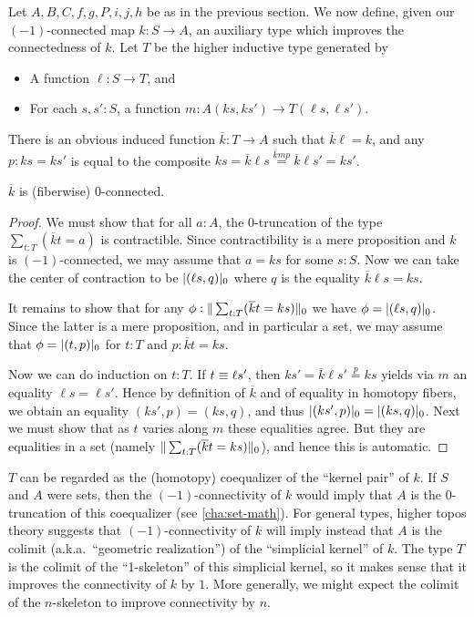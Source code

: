 Let $A,B,C,f,g,P,i,j,h$ be as in the previous section.
We now define, given our $(-1)$-connected map $k:S\to A$, an auxiliary type which improves the connectedness of $k$.
Let $T$ be the higher inductive type generated by
\begin{itemize}
\item A function $\ell:S\to T$, and
\item For each $s,s':S$, a function $m:A(ks,ks') \to T(\ell s, \ell s')$.
\end{itemize}
\newcommand{\kbar}{\overline{k}}
There is an obvious induced function $\kbar:T\to A$ such that $\kbar \ell = k$, and any $p:ks=ks'$ is equal to the composite $ks = \kbar \ell s \overset{\kbar m p}{=} \kbar \ell s' = k s'$.

\begin{lem}\label{thm:kbar}
  $\kbar$ is (fiberwise) 0-connected.
\end{lem}
\begin{proof}
  We must show that for all $a:A$, the 0-truncation of the type $\sum_{t:T}(\kbar t = a)$ is contractible.
  Since contractibility is a mere proposition and $k$ is $(-1)$-connected, we may assume that $a=ks$ for some $s:S$.
  Now we can take the center of contraction to be $\tproj0{(\ell s,q)}$ where $q$ is the equality $\kbar\ell s = k s$.

  It remains to show that for any $\phi:\trunc0{\sum_{t:T} (\kbar t = ks)}$ we have $\phi = \tproj0{(\ell s,q)}$.
  Since the latter is a mere proposition, and in particular a set, we may assume that $\phi=\tproj0{(t,p)}$ for $t:T$ and $p:\kbar t = ks$.

  Now we can do induction on $t:T$.
  If $t\jdeq\ell s'$, then $ks' = \kbar \ell s' \overset{p}{=} ks$ yields via $m$ an equality $\ell s = \ell s'$.
  Hence by definition of $\kbar$ and of equality in homotopy fibers, we obtain an equality $(ks',p) = (ks,q)$, and thus $\tproj0{(ks',p)} = \tproj0{(ks,q)}$.
  Next we must show that as $t$ varies along $m$ these equalities agree.
  But they are equalities in a set (namely $\trunc0{\sum_{t:T} (\kbar t = ks)}$), and hence this is automatic.
\end{proof}

\begin{rmk}
  $T$ can be regarded as the (homotopy) coequalizer of the ``kernel pair'' of $k$.
  If $S$ and $A$ were sets, then the $(-1)$-connectivity of $k$ would imply that $A$ is the $0$-truncation of this coequalizer (see \autoref{cha:set-math}).
  For general types, higher topos theory suggests that $(-1)$-connectivity of $k$ will imply instead that $A$ is the colimit (a.k.a.\ ``geometric realization'') of the ``simplicial kernel'' of $k$.
  The type $T$ is the colimit of the ``1-skeleton'' of this simplicial kernel, so it makes sense that it improves the connectivity of $k$ by $1$.
  More generally, we might expect the colimit of the $n$-skeleton to improve connectivity by $n$.
\end{rmk}


